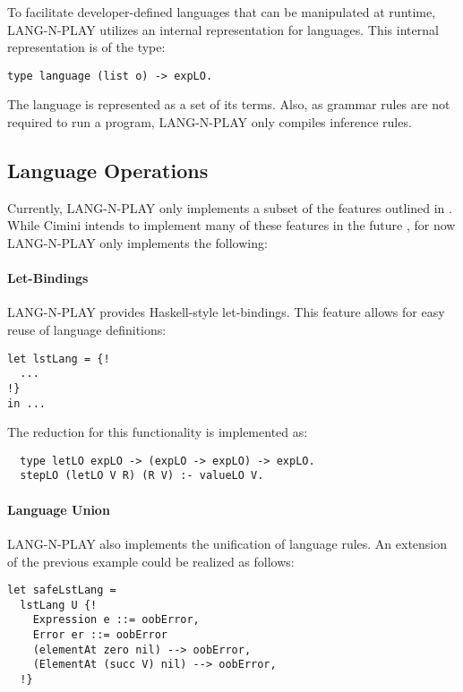 To facilitate developer-defined languages that can be manipulated at runtime, LANG-N-PLAY utilizes an internal representation for languages. This internal representation is of the type:

\begin{verbatim}
type language (list o) -> expLO.
\end{verbatim}

The language is represented as a set of its terms. Also, as grammar rules are not required to run a program, LANG-N-PLAY only compiles inference rules.


\subsection{Language Operations}
Currently, LANG-N-PLAY only implements a subset of the features outlined in . While Cimini intends to implement many of these features in the future \cite{cimini_effectiveness_2020}, for now LANG-N-PLAY only implements the following:

\paragraph{Let-Bindings}
LANG-N-PLAY provides Haskell-style let-bindings. This feature allows for easy reuse of language definitions:

\begin{verbatim}
let lstLang = {!
  ...
!}
in ...
\end{verbatim}

The reduction for this functionality is implemented as:

\begin{verbatim}
  type letLO expLO -> (expLO -> expLO) -> expLO.
  stepLO (letLO V R) (R V) :- valueLO V.
\end{verbatim}

\paragraph{Language Union}
LANG-N-PLAY also implements the unification of language rules. An extension of the previous example could be realized as follows:

\begin{verbatim}
let safeLstLang = 
  lstLang U {!
    Expression e ::= oobError,
    Error er ::= oobError
    (elementAt zero nil) --> oobError,
    (ElementAt (succ V) nil) --> oobError,
  !}
\end{verbatim}

